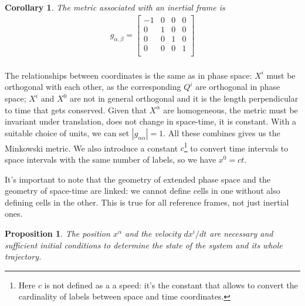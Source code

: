 \documentclass[aps,pra,10pt,twocolumn,floatfix,nofootinbib]{revtex4-1}
\newtheorem{cor}[thm]{Corollary}
\newtheorem{prop}[thm]{Proposition}
\theoremstyle{definition}
\begin{document}
\begin{cor}\label{continuousLabels}
The metric associated with an inertial frame is
\begin{align*}
g_{\alpha, \beta} =  \left[
  \begin{array}{cccc}
    -1 & 0 & 0 & 0 \\
    0 & 1 & 0 & 0 \\
    0 & 0 & 1 & 0 \\
    0 & 0 & 0 & 1 \\
  \end{array}
\right] \\
\end{align*}
\end{cor}

The relationships between coordinates is the same as in phase space: $X^i$ must be orthogonal with each other, as the corresponding $Q^i$ are orthogonal in phase space; $X^i$ and $X^0$ are not in general orthogonal and it is the length perpendicular to time that gets conserved. Given that $X^\alpha$ are homogeneous, the metric must be invariant under translation, does not change in space-time, it is constant. With a suitable choice of units, we can set $|g_{\alpha\alpha}|=1$. All these combines gives us the Minkowski metric. We also introduce a constant $c$\footnote{Here $c$ is not defined as a a speed: it's the constant that allows to convert the cardinality of labels between space and time coordinates.} to convert time intervals to space intervals with the same number of labels, so we have $x^0=ct$.

It's important to note that the geometry of extended phase space and the geometry of space-time are linked: we cannot define cells in one without also defining cells in the other. This is true for all reference frames, not just inertial ones.

\begin{prop}\label{continuousLabels}
The position $x^\alpha$ and the velocity $dx^i/dt$ are necessary and sufficient initial conditions to determine the state of the system and its whole trajectory.
\end{prop}
\end{document}

